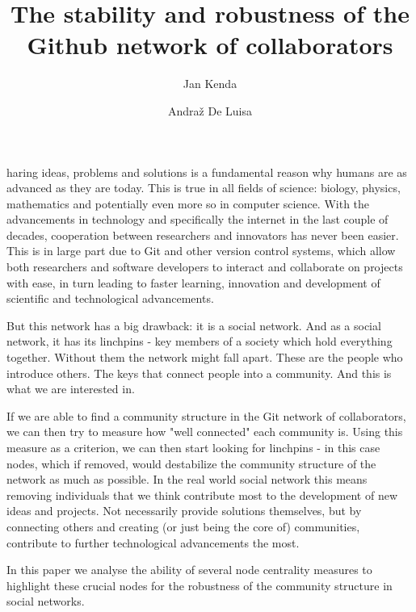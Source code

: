 \documentclass[9pt,twocolumn,twoside]{pnas-new}
\title{The stability and robustness of the Github network of collaborators}
\author[a]{Jan Kenda}
\author[b]{Andraž De Luisa}
\affil[a]{University of Ljubljana, Faculty of Computer and Information Science, Ljubljana, Slovenia, jk3977@student.uni-lj.si
}
\affil[b]{University of Ljubljana, Faculty of Computer and Information Science, Ljubljana, Slovenia, ad9366@student.uni-lj.si
}
\begin{document}
\maketitle
\thispagestyle{firststyle}

haring ideas, problems and solutions is a fundamental reason why humans are as advanced as they are today.
This is true in all fields of science: biology, physics, mathematics and potentially even more so in computer science.
With the advancements in technology and specifically the internet in the last couple of decades, 
cooperation between researchers and innovators has never been easier.
This is in large part due to Git and other version control systems, 
which allow both researchers and software developers to interact and collaborate on projects with ease,
in turn leading to faster learning, innovation and development of scientific and technological advancements.

But this network has a big drawback: it is a social network.
And as a social network, it has its linchpins - key members of a society which hold everything together.
Without them the network might fall apart. 
These are the people who introduce others. 
The keys that connect people into a community.
And this is what we are interested in.

If we are able to find a community structure in the Git network of collaborators, 
we can then try to measure how "well connected" each community is.
Using this measure as a criterion, we can then start looking for linchpins - 
in this case nodes, which if removed, would destabilize the community structure of the network as much as possible.
In the real world social network this means removing individuals that we think contribute most to the development of new ideas and projects.
Not necessarily provide solutions themselves, but by connecting others and creating (or just being the core of) communities, contribute to
further technological advancements the most.

In this paper we analyse the ability of several node centrality measures to highlight these crucial nodes for the robustness of the community structure in social networks.
\end{document}
